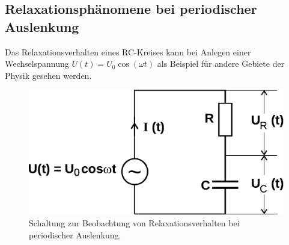 \subsection{Relaxationsphänomene bei periodischer Auslenkung}

    Das Relaxationsverhalten eines RC-Kreises kann bei Anlegen einer Wechselspannung $U(t) = U_0 \cos(\omega t)$ als Beispiel für andere Gebiete der Physik gesehen werden.

    \clearpage
    \begin{figure}
        \centering
        \includegraphics{content/img/Abb_2.pdf}
        \caption{Schaltung zur Beobachtung von Relaxationsverhalten bei periodischer Auslenkung. \cite{versuchsanleitung}}
        \label{fig:schaltung_wechselspannung}
    \end{figure}

